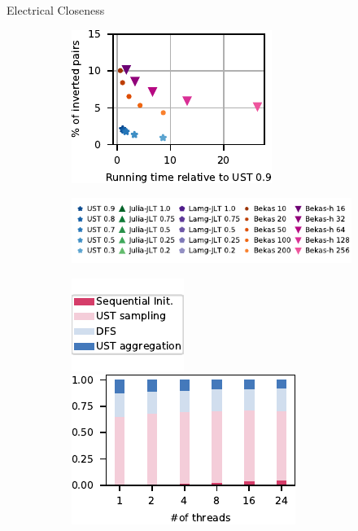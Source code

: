 \documentclass[10pt,titlepage,english,presentation]{beamer}
\begin{document}
\begin{frame}[t]{Electrical Closeness}
\begin{figure}
\begin{subfigure}[t]{.33\textwidth}
\includegraphics[width=.9\textwidth]{../sources/plots/el-clos/full-ranking.pdf}
\end{subfigure}

\begin{subfigure}[t]{\textwidth}
\centering
\includegraphics[width=.45\textwidth]{../sources/plots/el-clos/legend-quality.pdf}
\end{subfigure}\bigskip

\begin{subfigure}[t]{\textwidth}
\centering
\includegraphics[width=.15\textwidth]{../sources/plots/el-clos/legend-time-breakdown.pdf}
\hspace{2mm}
\includegraphics[width=.35\textwidth]{../sources/plots/el-clos/time-breakdown.pdf}
\end{subfigure}
\end{figure}
\end{frame}
\end{document}

